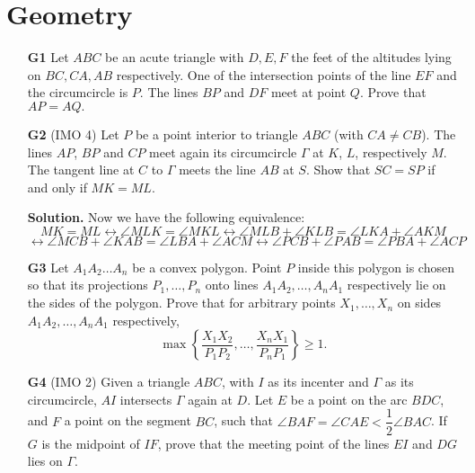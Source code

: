 \documentclass[12pt]{article}
\newcommand{\lra}{\leftrightarrow}
\newcommand{\<}{\langle}
\renewcommand{\>}{\rangle}
\begin{document}
\section*{Geometry}
\begin{enumerate}
	\item [\textbf{G1}] Let $ABC$ be an acute triangle with $D, E, F$ the feet of the altitudes lying on $BC, CA, AB$ respectively. One of the intersection points of the line $EF$ and the circumcircle is $P.$ The lines $BP$ and $DF$ meet at point $Q.$ Prove that $AP = AQ.$
	
	\item [\textbf{G2}] (IMO 4) Let $P$ be a point interior to triangle $ABC$ (with $CA \neq CB$). The lines $AP$, $BP$ and $CP$ meet again its circumcircle $\Gamma$ at $K$, $L$, respectively $M$. The tangent line at $C$ to $\Gamma$ meets the line $AB$ at $S$. Show that $SC = SP$ if and only if $MK = ML$.
	
	\textbf{Solution.} Now we have the following equivalence: 
	\[MK=ML\lra \angle MLK=\angle MKL \lra \angle MLB + \angle KLB = \angle LKA + \angle AKM\]
	\[\lra \angle MCB + \angle KAB = \angle LBA + \angle ACM
	\lra \angle PCB + \angle PAB = \angle PBA + \angle ACP
	\]
	
	\item [\textbf{G3}] Let $A_1A_2 \ldots A_n$ be a convex polygon. Point $P$ inside this polygon is chosen so that its projections $P_1, \ldots , P_n$ onto lines $A_1A_2, \ldots , A_nA_1$ respectively lie on the sides of the polygon. Prove that for arbitrary points $X_1, \ldots , X_n$ on sides $A_1A_2, \ldots , A_nA_1$ respectively,
	\[\max \left\{ \frac{X_1X_2}{P_1P_2}, \ldots, \frac{X_nX_1}{P_nP_1} \right\} \geq 1.\]
	
	\item [\textbf{G4}] (IMO 2) Given a triangle $ABC$, with $I$ as its incenter and $\Gamma$ as its circumcircle, $AI$ intersects $\Gamma$ again at $D$. Let $E$ be a point on the arc $BDC$, and $F$ a point on the segment $BC$, such that $\angle BAF=\angle CAE < \dfrac12\angle BAC$. If $G$ is the midpoint of $IF$, prove that the meeting point of the lines $EI$ and $DG$ lies on $\Gamma$. 
\end{enumerate}
	
	
\end{document}
